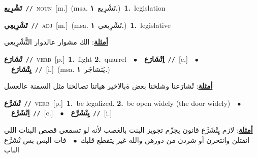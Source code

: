 \documentclass[10pt,a4paper,twoside]{article} %
\begin{document}
\begin{multicols}{2}
{\setlength\topsep{0pt}\textbf{\foreignlanguage{arabic}{تَشْرِيع}}\ {\color{gray}\texttt{//}\color{black}}\ \textsc{noun}\ [m.]\ \color{gray}(msa. \foreignlanguage{arabic}{تَشْرِِيع}~\foreignlanguage{arabic}{\textbf{١.}})\color{black}\ \textbf{1.}~legislation\ } \vspace{2mm}

{\setlength\topsep{0pt}\textbf{\foreignlanguage{arabic}{تَشْرِيعِي}}\ {\color{gray}\texttt{//}\color{black}}\ \textsc{adj}\ [m.]\ \color{gray}(msa. \foreignlanguage{arabic}{تَشْرِِيعي}~\foreignlanguage{arabic}{\textbf{١.}})\color{black}\ \textbf{1.}~legislative\  \begin{flushright}\color{gray}\foreignlanguage{arabic}{\textbf{\underline{\foreignlanguage{arabic}{أمثلة}}}: الك مشوار عالدوار التًّشْرِِيعي}\end{flushright}\color{black}} \vspace{2mm}

{\setlength\topsep{0pt}\textbf{\foreignlanguage{arabic}{تْشَارَع}}\ {\color{gray}\texttt{//}\color{black}}\ \textsc{verb}\ [p.]\ \textbf{1.}~fight  \textbf{2.}~quarrel\ \ $\bullet$\ \ \setlength\topsep{0pt}\textbf{\foreignlanguage{arabic}{اِتْشَارَع}}\ {\color{gray}\texttt{//}\color{black}}\ [c.]\ \ $\bullet$\ \ \setlength\topsep{0pt}\textbf{\foreignlanguage{arabic}{يِتْشَارَع}}\ {\color{gray}\texttt{//}\color{black}}\ [i.]\ \color{gray}(msa. \foreignlanguage{arabic}{يَتشاجَر}~\foreignlanguage{arabic}{\textbf{١.}})\color{black}\  \begin{flushright}\color{gray}\foreignlanguage{arabic}{\textbf{\underline{\foreignlanguage{arabic}{أمثلة}}}: تْشارَعنا وشلخنا بعض ةبالاخير هياتنا تصالحنا مثل السمنة عالعسل}\end{flushright}\color{black}} \vspace{2mm}

{\setlength\topsep{0pt}\textbf{\foreignlanguage{arabic}{تْشَرَّع}}\ {\color{gray}\texttt{//}\color{black}}\ \textsc{verb}\ [p.]\ \textbf{1.}~be legalized.  \textbf{2.}~be open widely (the door widely)\ \ $\bullet$\ \ \setlength\topsep{0pt}\textbf{\foreignlanguage{arabic}{اِتْشَرَّع}}\ {\color{gray}\texttt{//}\color{black}}\ [c.]\ \ $\bullet$\ \ \setlength\topsep{0pt}\textbf{\foreignlanguage{arabic}{يِتْشَرَّع}}\ {\color{gray}\texttt{//}\color{black}}\ [i.]\  \begin{flushright}\color{gray}\foreignlanguage{arabic}{\textbf{\underline{\foreignlanguage{arabic}{أمثلة}}}: لازم يِتْشَرَّع قانون يجرِّم تجويز البنت بالغصب لأنه لو تسمعي قصص البنات اللي انقتلن وانتحرن أو شردن من دورهن والله غير يتقطع قلبك\ $\bullet$\ \  فات البس بس تْشَرَّع الباب}\end{flushright}\color{black}} \vspace{2mm}


\end{multicols}
\end{document}
